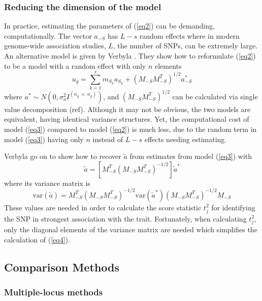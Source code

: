 \documentclass{article}
\begin{document}
\subsubsection{Reducing the dimension of the model}
In practice, estimating the parameters of (\ref{eq2}) can be demanding, computationally. 
The vector $a_{-S}$ has $L-s$ random effects where in modern genome-wide association studies, 
$L$, the number of SNPs, can be extremely large.  An alternative model is given by 
Verbyla \cite{verbyla2012rwgaim,verbyla2014whole}. 
They show how to reformulate (\ref{eq2}) to be a model with a random effect with only $n$ elements
\begin{equation}
\label{eq3}
u_g = \sum_{k=1}^s  m_{S_k} a_{S_k} + (M_{-S} M_{-S}^T)^{1/2} a^*_{-S}
\end{equation}
where $a^* \sim N(0, \sigma_a^2 I^{(n_g \; \times \;  n_g)})$, and 
$(M_{-S} M_{-S}^T)^{1/2}$ can be calculated via single value decomposition (ref).  
Although it may not be obvious, the two models are equivalent, 
having identical variance structures. Yet, the computational cost of model (\ref{eq3}) compared to 
model (\ref{eq2}) is much less, due to the random term in model (\ref{eq3}) having only $n$ instead of $L-s$ 
effects needing estimating. 

Verbyla \cite{verbyla2012rwgaim,verbyla2014whole} go on to show how to recover $\widetilde{a}$ from estimates from model  (\ref{eq3})  with 
\begin{equation}
\widetilde{a} = \left [ M_{-S}^T (M_{-S} M_{-S}^T)^{-1/2} \right ] \widetilde{a}^*
\end{equation}
where its variance matrix is
\begin{equation}
\label{eq4}
\textrm{var}(\widetilde{a}) = M_{-S}^T (M_{-S} M_{-S}^T)^{-1/2} \textrm{var}(\widetilde{a}^*) (M_{-S} M_{-S}^T)^{-1/2} M_{-S}
\end{equation}
These values are needed in order to calculate the score statistic $t_j^2$ for identifying the SNP in strongest association with the trait. 
Fortunately, when calculating $t_j^2$, only the diagonal elements of the variance matrix are needed which simplifies the  calculation 
of (\ref{eq4}). 


\subsection{Comparison Methods}

\subsubsection{Multiple-locus methods}
\end{document}
